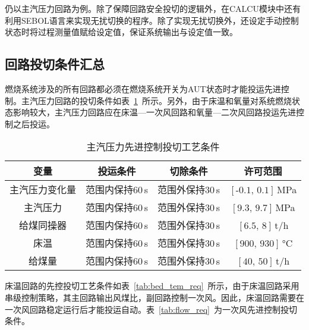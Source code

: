 仍以主汽压力回路为例。除了保障回路安全投切的逻辑外，在CALCU模块中还有利用SEBOL语言来实现无扰切换的程序。除了实现无扰切换外，还设定手动控制状态时将过程测量值赋给设定值，保证系统输出与设定值一致。
 
\subsection{回路投切条件汇总}
\label{sec:loop_req}

燃烧系统涉及的所有回路都必须在燃烧系统开关为AUT状态时才能投运先进控制。主汽压力回路的投切条件如表~\ref{tab:gas_pre_req}~所示。另外，由于床温和氧量对系统燃烧状态影响较大，主汽压力回路应在床温—一次风回路和氧量—二次风回路投运先进控制之后投运。

\begingroup
\renewcommand*{\arraystretch}{1.67}
\begin{table}[!h]
\small
\centering
\caption[主汽压力先进控制投切工艺条件]{主汽压力先进控制投切工艺条件} \label{tab:gas_pre_req}
\begin{tabular}{cccc}
\hline\hline
变量	&投运条件&	切除条件&	许可范围\\
\hline
主汽压力变化量&范围内保持60$\,$\si{s}&	范围外保持30$\,$\si{s}&	$[\textrm{-0.1},\,\textrm{0.1}]\,$\si{\mega\pascal}\\
主汽压力	&范围内保持60$\,$\si{s}	&范围外保持30$\,$\si{s}	&$[\textrm{9.3},\,\textrm{9.7}]\,$\si{\mega\pascal}\\
给煤同操器	&范围内保持60$\,$\si{s}	&范围外保持30$\,$\si{s}	&$[\textrm{6.5},\,\textrm{8}]\,$\si[per-mode=symbol]{\tonne\per\hour}\\
床温	&范围内保持60$\,$\si{s}	&范围外保持30$\,$\si{s}&	$[\textrm{900},\,\textrm{930}]\,$\si{\degreeCelsius}\\
给煤量	&范围内保持60$\,$\si{s}	&范围外保持30$\,$\si{s}	&$[\textrm{40},\,\textrm{50}]\,$\si[per-mode=symbol]{\tonne\per\hour}\\
\hline\hline
\end{tabular}
\end{table}
\endgroup


床温回路的先控投切工艺条件如表~\ref{tab:bed_tem_req}~所示，由于床温回路采用串级控制策略，其主回路输出风煤比，副回路控制一次风。因此，床温回路需要在一次风回路稳定运行后才能投运自动。表~\ref{tab:flow_req}~为一次风先进控制投切条件。

